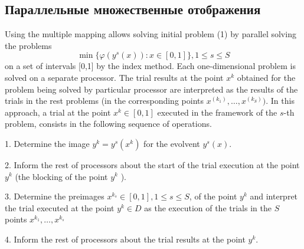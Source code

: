 \documentclass[runningheads]{llncs}
\begin{document}
\subsection{Параллельные множественные отображения}
\label{sec:parallel_evolvents}
Using the multiple mapping allows solving initial problem (1) by parallel solving the problems
\[
\min\{\varphi(y^s(x)):x\in [0,1]\}, 1≤s≤S
\]
on a set of intervals [0,1] by the index method. Each one-dimensional problem is solved on a separate processor. The trial results at the point \(x^k\) obtained for the problem being solved by particular processor are interpreted as the results of the trials in the rest problems (in the corresponding points \(x^(k_1 ),…,x^(k_S ))\). In this approach, a trial at the point \(x^k \in [0,1]\) executed in the framework of the \(s\)-th problem, consists in the following sequence of operations.
\par
1. Determine the image \(y^k=y^s (x^k)\) for the evolvent \(y^s (x)\).
\par
2. Inform the rest of processors about the start of the trial execution at the point\( y^k\) (the blocking of the point \(y^k\) ).
\par
3. Determine the preimages \(x{}^{k_s}  \in [0,1], 1≤s≤S\), of the point \(y^k\) and interpret the trial executed at the point \(y^k \in D \) as the execution of the trials in the \(S\) points \(x{}^{k_1} ,…,x{}^{k_s} \)
\par
4. Inform the rest of processors about the trial results at the point \(y^k\).
\par
\end{document}
